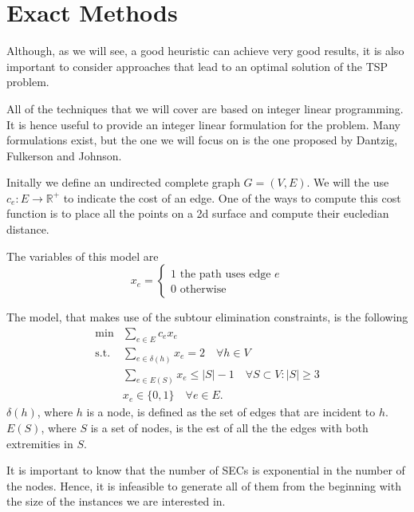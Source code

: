\documentclass{article}
\begin{document}
\clearpage

\section{Exact Methods}
Although, as we will see, a good heuristic can achieve very good results, it is also
important to consider approaches that lead to an optimal solution of the
TSP problem.

All of the techniques that we will cover are based on integer linear programming. It is
hence useful to provide an integer linear formulation for the problem.
Many formulations exist, but the one we will focus on is the one proposed by
Dantzig, Fulkerson and Johnson. %

Initally we define an undirected complete graph $G=(V, E)$.
We will the use $c_e : E \rightarrow \mathbb{R}^+$ to indicate the cost of
an edge.
One of the ways to compute this cost function is to place all the points
on a 2d surface and compute their eucledian distance.

The variables of this model are
\begin{equation*}
        x_e =
        \left\{
                \begin{array}{l}
                1 \text{ the path uses edge $e$}\\
                0 \text{ otherwise }
        \end{array}
        \right.
\end{equation*}

The model, that makes use of the subtour elimination constraints, is the
following
\begin{equation}
  \begin{aligned}
\min & \sum_{e \in E} c_e x_e \\
\text{s.t.}
& \sum_{e \in \delta(h)} x_{e} = 2 \quad \forall h \in V \\
& \sum_{e \in E(S)} x_{e} \leq |S| - 1 \quad \forall S \subset V : |S| \geq 3 \\
& x_{e} \in \{0, 1\} \quad \forall e \in E.
\end{aligned}
\end{equation}
$\delta(h)$, where $h$ is a node, is defined as the set of edges that are
incident to $h$. $E(S)$, where $S$ is a set of nodes, is the est of all the
the edges with both extremities in $S$.

It is important to know that the number of SECs is exponential in the number of
the nodes. Hence, it is infeasible to generate all of them from the beginning
with the size of the instances we are interested in.
\end{document}
